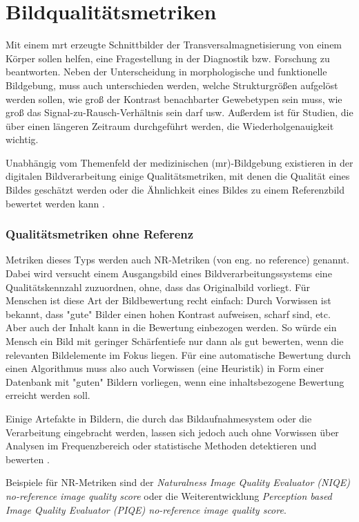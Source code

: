 \section{Bildqualitätsmetriken}
\label{sec:metrics}
Mit einem \gls{mrt} erzeugte Schnittbilder der Transversalmagnetisierung von einem Körper sollen helfen, eine Fragestellung in der Diagnostik bzw. Forschung zu beantworten. Neben der Unterscheidung in morphologische und funktionelle Bildgebung, muss auch unterschieden werden, welche Strukturgrößen aufgelöst werden sollen, wie groß der Kontrast benachbarter Gewebetypen sein muss, wie groß das Signal-zu-Rausch-Verhältnis sein darf usw. Außerdem ist für Studien, die über einen längeren Zeitraum durchgeführt werden, die Wiederholgenauigkeit wichtig.

Unabhängig vom Themenfeld der medizinischen (\gls{mr})-Bildgebung existieren in der digitalen Bildverarbeitung einige Qualitätsmetriken, mit denen die Qualität eines Bildes geschätzt werden oder die Ähnlichkeit eines Bildes zu einem Referenzbild bewertet werden kann \cite{Wang2006}.

\subsubsection{Qualitätsmetriken ohne Referenz}
Metriken dieses Typs werden auch NR-Metriken (von eng. no reference) genannt. Dabei wird versucht einem Ausgangsbild eines Bildverarbeitungssystems eine Qualitätskennzahl zuzuordnen, ohne, dass das Originalbild vorliegt. Für Menschen ist diese Art der Bildbewertung recht einfach: Durch Vorwissen ist bekannt, dass "gute" Bilder einen hohen Kontrast aufweisen, scharf sind, etc. Aber auch der Inhalt kann in die Bewertung einbezogen werden. So würde ein Mensch ein Bild mit geringer Schärfentiefe nur dann als gut bewerten, wenn die relevanten Bildelemente im Fokus liegen. Für eine automatische Bewertung durch einen Algorithmus muss also auch Vorwissen (eine Heuristik) in Form einer Datenbank mit "guten" Bildern vorliegen, wenn eine inhaltsbezogene Bewertung erreicht werden soll.

Einige Artefakte in Bildern, die durch das Bildaufnahmesystem oder die Verarbeitung eingebracht werden, lassen sich jedoch auch ohne Vorwissen über Analysen im Frequenzbereich oder statistische Methoden detektieren und bewerten \cite[S.~86]{Wang2006}.

Beispiele für NR-Metriken sind der \textit{Naturalness Image Quality Evaluator (NIQE) no-reference image quality score}\cite{Mittal2013} oder die Weiterentwicklung \textit{Perception based Image Quality Evaluator (PIQE) no-reference image quality score}\cite{Venkatanath2015}.


